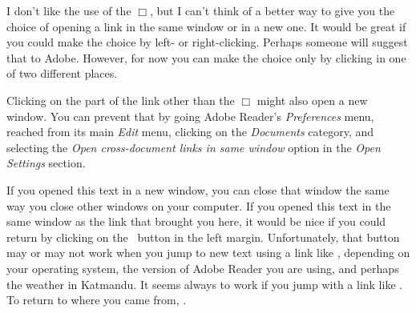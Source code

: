 \documentclass[fleqn,leqno]{article}
\begin{document}
\noindent I don't like the use of the $\Box$, but I can't think of a
better way to give you the choice of opening a link in the same
window or in a new one.  It would be great if you could make the
choice by left- or right-clicking.  Perhaps someone will suggest that
to Adobe.  However, for now you can make the choice only by clicking
in one of two different places.

Clicking on the part of the link other than the $\Box$ might also
open a new window.  You can prevent that by going Adobe Reader's
\emph{Preferences} menu, reached from its main \emph{Edit} menu,
clicking on the \emph{Documents} category, and selecting the
\emph{Open cross-document links in same window} option in the
\emph{Open Settings} section.

If you opened this text in a new window, you can close that window the
same way you close other windows on your computer.  If you opened this
text in the same window as the link that brought you here, it would be
nice if you could return by clicking on the \backbutton\ button in the
left margin.  Unfortunately, that button may or may not work when
you jump to new text using a link like ,
depending on your operating system, the version of Adobe Reader you
are using, and perhaps the weather in Katmandu.  It seems always to
work if you jump with a link like .  To return to
where you came from, .

\end{document}
